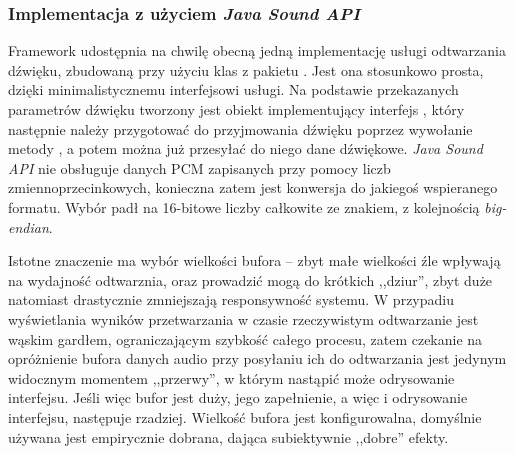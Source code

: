 \subsubsection{Implementacja z użyciem \emph{Java Sound API}}

Framework udostępnia na chwilę obecną jedną implementację usługi odtwarzania dźwięku, zbudowaną przy
użyciu klas z pakietu . Jest ona stosunkowo prosta, dzięki minimalistycznemu
interfejsowi usługi. Na podstawie przekazanych parametrów dźwięku tworzony jest obiekt
implementujący interfejs , który następnie należy przygotować do przyjmowania
dźwięku poprzez wywołanie metody , a potem można już przesyłać do niego dane dźwiękowe.
\emph{Java Sound API} nie obsługuje danych PCM zapisanych przy pomocy liczb zmiennoprzecinkowych,
konieczna zatem jest konwersja do jakiegoś wspieranego formatu. Wybór padł na 16-bitowe liczby
całkowite ze znakiem, z kolejnością \textit{big-endian}.

\begin{NoteLong}
Istotne znaczenie ma wybór wielkości bufora -- zbyt małe wielkości źle wpływają na wydajność
odtwarznia, oraz prowadzić mogą do krótkich ,,dziur'', zbyt duże natomiast drastycznie zmniejszają
responsywność systemu. W przypadiu wyświetlania wyników przetwarzania w czasie rzeczywistym
odtwarzanie jest wąskim gardłem, ograniczającym szybkość całego procesu, zatem czekanie na
opróżnienie bufora danych audio przy posyłaniu ich do odtwarzania jest jedynym widocznym momentem
,,przerwy'', w którym nastąpić może odrysowanie interfejsu. Jeśli więc bufor jest duży, jego
zapełnienie, a więc i odrysowanie interfejsu, następuje rzadziej. Wielkość bufora jest
konfigurowalna, domyślnie używana jest empirycznie dobrana, dająca subiektywnie ,,dobre'' efekty.
\end{NoteLong}

